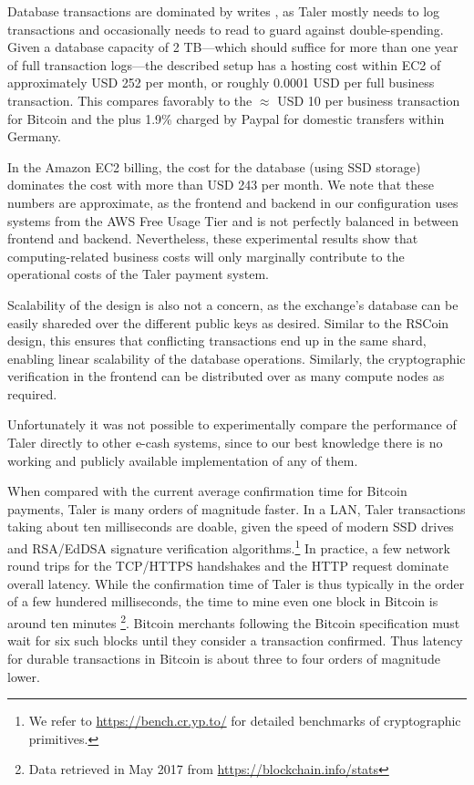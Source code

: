 \documentclass[sigconf, authordraft]{acmart}
\begin{document}
Database transactions are dominated by writes%
, as Taler mostly needs to log
transactions and occasionally needs to read to guard against
double-spending.  Given a database capacity of 2 TB---which should
suffice for more than one year of full transaction logs---the
described setup has a hosting cost within EC2 of approximately USD 252
per month, or roughly 0.0001 USD per full business transaction.  This
compares favorably to the $\approx$ USD 10 per business transaction
for Bitcoin and the  plus 1.9\% charged by Paypal for
domestic transfers within Germany.

In the Amazon EC2 billing, the cost for the database (using SSD
storage) dominates the cost with more than USD 243 per month.  We note
that these numbers are approximate, as the frontend and backend in our
configuration uses systems from the AWS Free Usage Tier and is not
perfectly balanced in between frontend and backend.  Nevertheless,
these experimental results show that computing-related business costs
will only marginally contribute to the operational costs of the Taler
payment system.

Scalability of the design is also not a concern, as the exchange's
database can be easily shareded over the different public keys as
desired.  Similar to the RSCoin~\cite{danezis2016rscoin} design, this
ensures that conflicting transactions end up in the same shard,
enabling linear scalability of the database operations.  Similarly,
the cryptographic verification in the frontend can be distributed over
as many compute nodes as required.

Unfortunately it was not possible to experimentally compare the performance of
Taler directly to other e-cash systems, since to our best knowledge there
is no working and publicly available implementation of any of them.

When compared with the current average confirmation time for Bitcoin
payments, Taler is many orders of magnitude faster.  In a LAN, Taler
transactions taking about ten milliseconds are doable, given the speed
of modern SSD drives and RSA/EdDSA signature verification
algorithms.\footnote{We refer to \url{https://bench.cr.yp.to/} for
  detailed benchmarks of cryptographic primitives.}  In practice, a
few network round trips for the TCP/HTTPS handshakes and the HTTP
request dominate overall latency.  While the confirmation time of
Taler is thus typically in the order of a few hundered milliseconds,
the time to mine even one block in Bitcoin is around ten
minutes \footnote{Data retrieved in May 2017 from
  \url{https://blockchain.info/stats}}.  Bitcoin merchants following
the Bitcoin specification must wait for six such blocks until they
consider a transaction confirmed.  Thus latency for durable
transactions in Bitcoin is about three to four orders of magnitude
lower.
\end{document}
